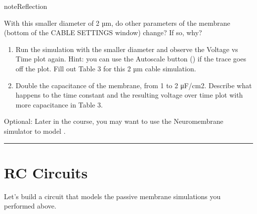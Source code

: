 \documentclass[letterpaper,10pt,english]{jupyterBook}
\begin{document}
\begin{sphinxadmonition}{note}{Reflection}

\sphinxAtStartPar
With this smaller diameter of 2 µm, do other parameters of the membrane (bottom of the CABLE SETTINGS window) change? If so, why?
\end{sphinxadmonition}
\begin{enumerate}
%
\setcounter{enumi}{5}
\item {} 
\sphinxAtStartPar
Run the simulation with the smaller diameter and observe the Voltage vs Time plot again. Hint: you can use the Autoscale button () if the trace goes off the plot. Fill out Table 3 for this 2 µm cable simulation.

\item {} 
\sphinxAtStartPar
Double the capacitance of the membrane, from 1 to 2 μF/cm2. Describe what happens to the time constant and the resulting voltage over time plot with more capacitance in Table 3.

\end{enumerate}

\sphinxAtStartPar
Optional: Later in the course, you may want to use the Neuromembrane simulator to model .


\bigskip\hrule\bigskip



\section{RC Circuits}
\label{\detokenize{ModelingNeuralMembranes:rc-circuits}}
\sphinxAtStartPar
Let’s build a circuit that models the passive membrane simulations you performed above.
\end{document}
